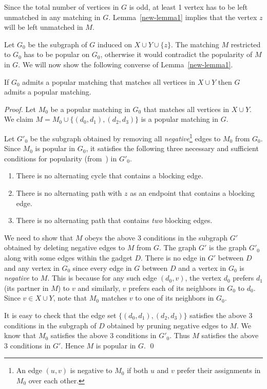 \documentclass{llncs}
\begin{document}
Since the total number of vertices in $G$ is odd, at least 1 vertex has to be left unmatched in any matching in $G$.
Lemma~\ref{new-lemma1} implies that the vertex $z$ will be left unmatched in $M$.

Let $G_0$ be the subgraph of $G$ induced on $X \cup Y \cup \{z\}$. The matching $M$ restricted to $G_0$ has to be popular on $G_0$, otherwise it would
contradict the popularity of $M$ in $G$. We will now show the following converse of Lemma~\ref{new-lemma1}.

\begin{lemma}
    \label{new-lemma2}
    If $G_0$ admits a popular matching that matches all vertices in $X \cup Y$ then $G$ admits a popular matching.
\end{lemma}
\begin{proof}
  Let $M_0$ be a popular matching in $G_0$ that matches all vertices in $X \cup Y$. We claim $M = M_0 \cup \{(d_0,d_1),(d_2,d_3)\}$ is a popular matching in $G$.
  

  Let $G'_0$ be the subgraph obtained by
  removing all {\em negative}\footnote{An edge $(u,v)$ is negative to $M_0$ if both $u$ and $v$ prefer their assignments in $M_0$ over each other.} edges
  to $M_0$ from $G_0$. Since $M_0$ is popular in $G_0$, it satisfies the following three necessary and sufficient conditions for
  popularity (from~\cite{HK11}) in $G'_0$.

  \begin{enumerate}
      \item There is no alternating cycle that contains a blocking edge.
      \item There is no alternating path with $z$ as an endpoint that contains a blocking edge.
      \item There is no alternating path that contains {\em two} blocking edges.
  \end{enumerate}
  
  We need to show that $M$ obeys the above 3 conditions in the subgraph $G'$ obtained by deleting negative edges to $M$ from $G$.
  The graph $G'$ is the graph $G'_0$ along with some edges within the gadget $D$.
  There is no edge in $G'$ between $D$ and any vertex in $G_0$ since every edge in $G$ between  $D$ and a vertex in $G_0$ is {\em negative}
  to $M$. This is because for any such edge $(d_0,v)$, the vertex $d_0$ prefers $d_1$ (its partner in $M$) to $v$ and similarly, $v$ prefers each
  of its neighbors in $G_0$ to $d_0$. Since $v \in X \cup Y$, note that $M_0$ matches $v$ to one of its neighbors in $G_0$.

  It is easy to check that the edge set $\{(d_0,d_1),(d_2,d_3)\}$ satisfies the above 3 conditions in the subgraph of $D$ obtained by pruning negative edges
  to $M$. We know that
  $M_0$ satisfies the above 3 conditions in $G'_0$.  Thus $M$ satisfies the above 3 conditions in $G'$. Hence $M$ is popular in $G$. \qed
\end{proof}
\end{document}
